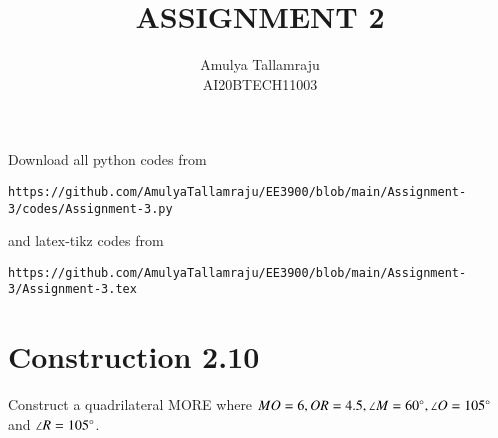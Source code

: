 \documentclass[journal,12pt,twocolumn]{IEEEtran}
\begin{document}
     \def\centbox#1{\makebox[0in]{#1}}
     \def\topbox#1{\raisebox{-\baselineskip}[0in][0in]{#1}}
     \def\midbox#1{\raisebox{-0.5\baselineskip}[0in][0in]{#1}}
\vspace{3cm}
\title{ASSIGNMENT 2}
\author{Amulya Tallamraju \\ AI20BTECH11003}
\maketitle
\newpage
\bigskip
\renewcommand{\thefigure}{\theenumi}
\renewcommand{\thetable}{\theenumi}
Download all python codes from 
\begin{lstlisting}
https://github.com/AmulyaTallamraju/EE3900/blob/main/Assignment-3/codes/Assignment-3.py
\end{lstlisting}
%
and latex-tikz codes from 
%
\begin{lstlisting}
https://github.com/AmulyaTallamraju/EE3900/blob/main/Assignment-3/Assignment-3.tex
\end{lstlisting}
\section{Construction 2.10}
Construct a quadrilateral MORE where $MO = 6, OR = 4.5, \angle M = 60 \degree, \angle O = 105 \degree$ and $\angle R = 105 \degree$.
%
\end{document}
